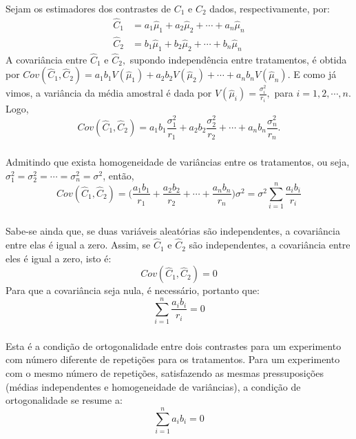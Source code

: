 \documentclass[14pt,aspectratio=1610]{beamer}
\begin{document}
\begin{frame}{}
\frametitle{}
\begin{block}{}
\justifying
Sejam os estimadores dos contrastes de $C_{1}$ e $C_{2}$ dados, respectivamente, por:
\begin{align*}
\hat{C}_{1}&=a_{1}\hat{\mu}_{1}+a_{2}\hat{\mu}_{2}+\cdots+a_{n}\hat{\mu}_{n}\\
\hat{C}_{2}&=b_{1}\hat{\mu}_{1}+b_{2}\hat{\mu}_{2}+\cdots+b_{n}\hat{\mu}_{n}
\end{align*}
A covariância entre $\hat{C}_{1}$ e $\hat{C}_{2},$ supondo independência entre tratamentos, é obtida por 
$Cov(\hat{C}_{1},\hat{C}_{2})=a_{1}b_{1}V(\hat{\mu}_{1})+a_{2}b_{2}V(\hat{\mu}_{2})+
\cdots+a_{n}b_{n}V(\hat{\mu}_{n}).$ E como já vimos, a variância da média amostral é dada por $V(\hat{\mu}_{i})=\frac{\sigma_{i}^{2}}{r_{i}},$ para $i=1,2,\cdots,n.$ Logo,
$$Cov(\hat{C}_{1},\hat{C}_{2})=a_{1}b_{1}\dfrac{\sigma_{1}^{2}}{r_{1}}+a_{2}b_{2}\dfrac{\sigma_{2}^{2}}{r_{2}}+
\cdots+a_{n}b_{n}\dfrac{\sigma_{n}^{2}}{r_{n}}.$$
\end{block}
\end{frame}

\begin{frame}{}
\frametitle{}
\begin{block}{}
\justifying
Admitindo que exista homogeneidade de variâncias entre os tratamentos, ou seja, 
$\sigma_{1}^{2}=\sigma_{2}^{2}=\cdots=\sigma_{n}^{2}=\sigma^{2}$, então,
$$Cov(\hat{C}_{1},\hat{C}_{2})=\Biggl(\dfrac{a_{1}b_{1}}{r_{1}}+\dfrac{a_{2}b_{2}}{r_{2}}+\cdots+\dfrac{a_{n}b_{n}}{r_{n}}\Biggl)\sigma^{2}=\sigma^{2}{\displaystyle \sum_{i=1}^{n}\dfrac{a_{i}b_{i}}{r_{i}}}$$
\end{block}
\end{frame}

\begin{frame}{}
\frametitle{}
\begin{block}{}
\justifying
Sabe-se ainda que, se duas variáveis aleatórias são independentes, a covariância entre
elas é igual a zero. Assim, se $\hat{C}_{1}$ e $\hat{C}_{2}$ são independentes, a covariância entre eles é igual a zero, isto é: $$Cov(\hat{C}_{1},\hat{C}_{2})=0$$
Para que a covariância seja nula, é necessário, portanto que:
$${\displaystyle \sum_{i=1}^{n}\dfrac{a_{i}b_{i}}{r_{i}}}=0$$
\end{block}
\end{frame}

\begin{frame}{}
\frametitle{}
\begin{block}{}
\justifying
Esta é a condição de ortogonalidade entre dois contrastes para um experimento
com número diferente de repetições para os tratamentos. Para um experimento com o
mesmo número de repetições, satisfazendo as mesmas pressuposições (médias
independentes e homogeneidade de variâncias), a condição de ortogonalidade se resume
a: $${\displaystyle \sum_{i=1}^{n}a_{i}b_{i}}=0$$
\end{block}
\end{frame}
\end{document}
